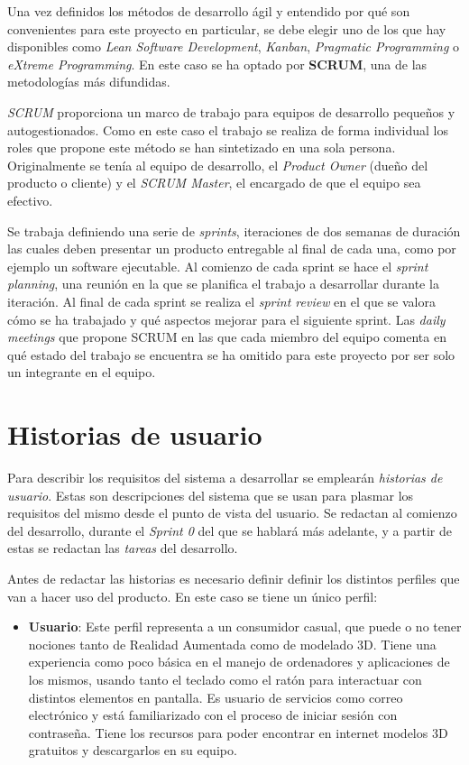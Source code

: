 Una vez definidos los métodos de desarrollo ágil y entendido por qué son convenientes para este proyecto en particular, se debe elegir uno de los que hay disponibles como \textit{Lean Software Development}, \textit{Kanban}, \textit{Pragmatic Programming} o \textit{eXtreme Programming}. En este caso se ha optado por \textbf{SCRUM}\cite{scrum}, una de las metodologías más difundidas.

\textit{SCRUM} proporciona un marco de trabajo para equipos de desarrollo pequeños y autogestionados. Como en este caso el trabajo se realiza de forma individual los roles que propone este método se han sintetizado en una sola persona. Originalmente se tenía al equipo de desarrollo, el \textit{Product Owner} (dueño del producto o cliente) y el \textit{SCRUM Master}, el encargado de que el equipo sea efectivo.

Se trabaja definiendo una serie de \textit{sprints}, iteraciones de dos semanas de duración las cuales deben presentar un producto entregable al final de cada una, como por ejemplo un software ejecutable. Al comienzo de cada  sprint se hace el \textit{sprint planning}, una reunión en la que se planifica el trabajo a desarrollar durante la iteración. Al final de cada sprint se realiza el \textit{sprint review} en el que se valora cómo se ha trabajado y qué aspectos mejorar para el siguiente sprint. Las \textit{daily meetings} que propone SCRUM en las que cada miembro del equipo comenta en qué estado del trabajo se encuentra se ha omitido para este proyecto por ser solo un integrante en el equipo.

\section{Historias de usuario}

Para describir los requisitos del sistema a desarrollar se emplearán \textit{historias de usuario}. Estas son descripciones del sistema que se usan para plasmar los requisitos del mismo desde el punto de vista del usuario. Se redactan al comienzo del desarrollo, durante el \textit{Sprint 0} del que se hablará más adelante, y a partir de estas se redactan las \textit{tareas} del desarrollo.

Antes de redactar las historias es necesario definir definir los distintos perfiles que van a hacer uso del producto. En este caso se tiene un único perfil:

\begin{itemize}
    \item \textbf{Usuario}: Este perfil representa a un consumidor casual, que puede o no tener nociones tanto de Realidad Aumentada como de modelado 3D. Tiene una experiencia como poco básica en el manejo de ordenadores y aplicaciones de los mismos, usando tanto el teclado como el ratón para interactuar con distintos elementos en pantalla. Es usuario de servicios como correo electrónico y está familiarizado con el proceso de iniciar sesión con contraseña. Tiene los recursos para poder encontrar en internet modelos 3D gratuitos y descargarlos en su equipo.
\end{itemize}

